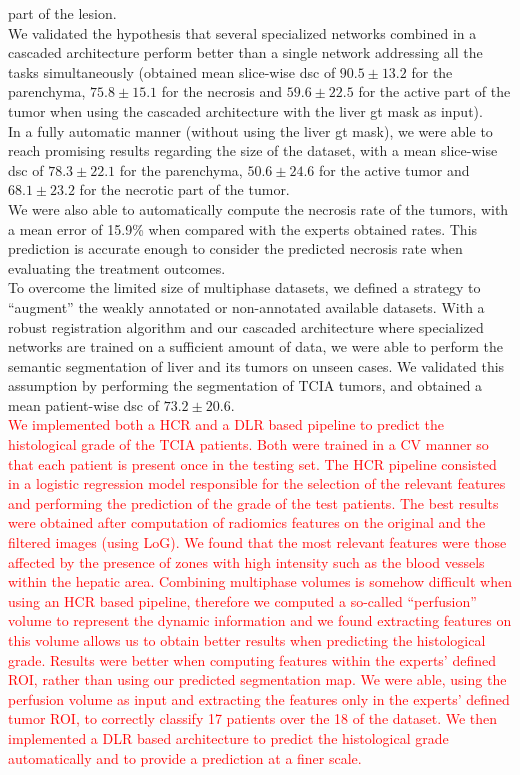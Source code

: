 part of the lesion. \\
We validated the hypothesis that several specialized networks combined
in a cascaded architecture perform better than a single network
addressing all the tasks simultaneously (obtained mean slice-wise \ac{dsc} of
$ 90.5 \pm 13.2 $ for the parenchyma, $ 75.8 \pm 15.1 $ for the necrosis and $ 59.6 \pm
22.5 $ for the active part of the tumor when using the cascaded
architecture with the liver \ac{gt} mask as input).\\
In a fully automatic manner (without using the liver \ac{gt} mask), we were
able to reach promising results regarding the size of the dataset, with
a mean slice-wise \ac{dsc} of $ 78.3 \pm 22.1 $ for the parenchyma, $ 50.6 \pm 24.6 $ for
the active tumor and $ 68.1 \pm 23.2 $ for the necrotic part of the tumor.\\
We were also able to automatically compute the necrosis rate of the
tumors, with a mean error of 15.9\% when compared with the experts
obtained rates. This prediction is accurate enough to consider the
predicted necrosis rate when evaluating the treatment outcomes. \\
To overcome the limited size of multiphase datasets, we defined a
strategy to ``augment'' the weakly annotated or non-annotated available
datasets.
With a robust registration algorithm and our cascaded architecture where
specialized networks are trained on a sufficient amount of data, we were
able to perform the semantic segmentation of liver and its tumors on
unseen cases.
We validated this assumption by performing the segmentation of TCIA
tumors, and obtained a mean patient-wise \ac{dsc} of $ 73.2 \pm 20.6 $.\\
\textcolor{red}
{
We implemented both a HCR and a DLR based pipeline to predict the histological grade of the TCIA patients. Both were trained in a CV manner so that each patient is present once in the testing set. The HCR pipeline consisted in a logistic regression model responsible for the selection of the relevant features and performing the prediction of the grade of the test patients. The best results were obtained after computation of radiomics features on the original and the filtered images (using LoG). We found that the most relevant features were those affected by the presence of zones with high intensity such as the blood vessels within the hepatic area. Combining multiphase volumes is somehow difficult when using an HCR based pipeline, therefore we computed a so-called ``perfusion'' volume to represent the dynamic information and we found extracting features on this volume allows us to obtain better results when predicting the histological grade. Results were better when computing features within the experts' defined ROI, rather than using our predicted segmentation map. We were able, using the perfusion volume as input and extracting the features only in the experts' defined tumor ROI, to correctly classify 17 patients over the 18 of the dataset.
We then implemented a DLR based architecture to predict the histological grade automatically and to provide a prediction at a finer scale.
}
